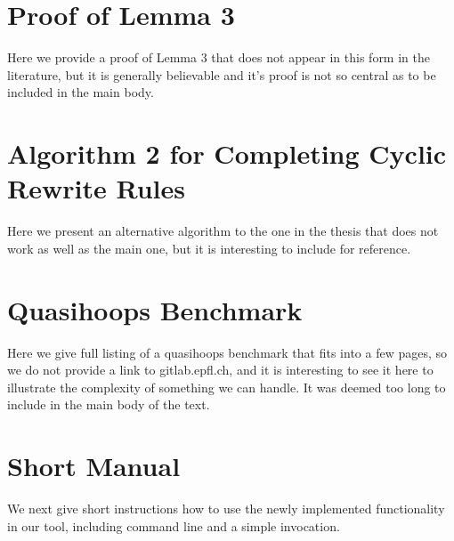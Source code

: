 \chapter{Proof of Lemma 3}

Here we provide a proof of Lemma 3 that does not appear in this form in the literature, but it is generally believable and it's proof is not so central as to be included in the main body.

\chapter{Algorithm 2 for Completing Cyclic Rewrite Rules}

Here we present an alternative algorithm to the one in the thesis that
does not work as well as the main one, but it is interesting to include for reference.

\chapter{Quasihoops Benchmark}

Here we give full listing of a quasihoops benchmark that fits into a few pages, so we do not provide a link to gitlab.epfl.ch, and it is interesting to see it here to illustrate the complexity of something we can handle. It was deemed too long to include in the main body of the text.

\chapter{Short Manual}

We next give short instructions how to use the newly implemented functionality in our tool, including command line and a simple invocation.
